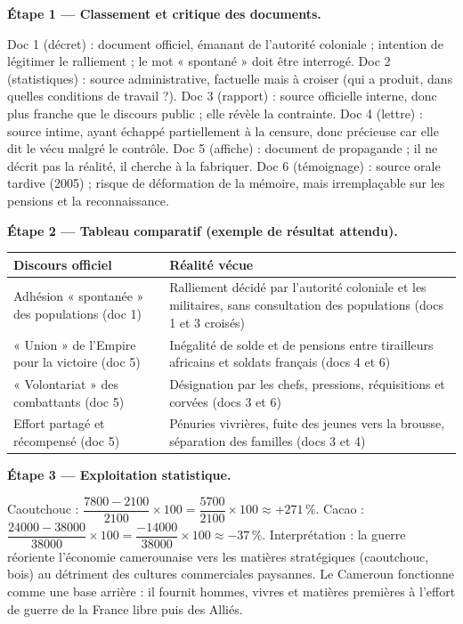 \documentclass[11pt]{article}
\newcommand{\cle}[1]{{\popxbold\color{popdark}#1}}
\newcounter{popsec}
\newcounter{popsub}
\newcommand{\courssub}[1]{%
  \stepcounter{popsub}%
  \par\vspace{9pt}\noindent{\popxbold\fontsize{11.5}{13}\selectfont\color{popink}{\color{poporange}\thepopsec.\thepopsub}\hspace{6pt}#1}\par\nopagebreak\vspace{4pt}
}
\begin{document}
\courssub{Démarche et corrigé commenté}

\begin{exoresolu}
\textbf{Étape 1 — Classement et critique des documents.}

Doc 1 (décret) : document \cle{officiel}, émanant de l'autorité coloniale ; intention de légitimer le ralliement ; le mot « spontané » doit être interrogé. Doc 2 (statistiques) : source administrative, factuelle mais à croiser (qui a produit, dans quelles conditions de travail ?). Doc 3 (rapport) : source officielle interne, donc plus franche que le discours public ; elle révèle la contrainte. Doc 4 (lettre) : source \cle{intime}, ayant échappé partiellement à la censure, donc précieuse car elle dit le vécu malgré le contrôle. Doc 5 (affiche) : document de \cle{propagande} ; il ne décrit pas la réalité, il cherche à la fabriquer. Doc 6 (témoignage) : source orale tardive (2005) ; risque de déformation de la mémoire, mais irremplaçable sur les pensions et la reconnaissance.

\tcblower

\textbf{Étape 2 — Tableau comparatif (exemple de résultat attendu).}

\begin{center}
\begin{tabularx}{\linewidth}{|X|X|}\hline
\rowcolor{popblueL} \textbf{Discours officiel} & \textbf{Réalité vécue} \\ \hline
Adhésion « spontanée » des populations (doc 1) & Ralliement décidé par l'autorité coloniale et les militaires, sans consultation des populations (docs 1 et 3 croisés) \\ \hline
« Union » de l'Empire pour la victoire (doc 5) & Inégalité de solde et de pensions entre tirailleurs africains et soldats français (docs 4 et 6) \\ \hline
« Volontariat » des combattants (doc 5) & Désignation par les chefs, pressions, réquisitions et corvées (docs 3 et 6) \\ \hline
Effort partagé et récompensé (doc 5) & Pénuries vivrières, fuite des jeunes vers la brousse, séparation des familles (docs 3 et 4) \\ \hline
\end{tabularx}
\end{center}

\textbf{Étape 3 — Exploitation statistique.}

Caoutchouc : $\dfrac{7800 - 2100}{2100} \times 100 = \dfrac{5700}{2100} \times 100 \approx +271\,\%$. Cacao : $\dfrac{24000 - 38000}{38000} \times 100 = \dfrac{-14000}{38000} \times 100 \approx -37\,\%$. Interprétation : la guerre réoriente l'économie camerounaise vers les matières \cle{stratégiques} (caoutchouc, bois) au détriment des cultures commerciales paysannes. Le Cameroun fonctionne comme une \cle{base arrière} : il fournit hommes, vivres et matières premières à l'effort de guerre de la France libre puis des Alliés.


\end{exoresolu}
\end{document}
